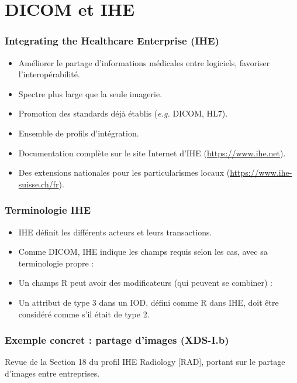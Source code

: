 \section{DICOM et IHE}

 \frame
 {
 	\frametitle{Integrating the Healthcare Enterprise (IHE)}
	
	\begin{itemize} 	 	
		\item Am\'eliorer le partage d'informations m\'edicales entre logiciels, favoriser l'interop\'erabilit\'e.
		\item<2-> Spectre plus large que la seule imagerie.
		\item<3-> Promotion des standards d\'ej\`a \'etablis (\emph{e.g.} DICOM, HL7).
		\item<4-> Ensemble de profils d'int\'egration.
		\item<5-> Documentation compl\`ete sur le site Internet d'IHE (\url{https://www.ihe.net}).
		\item<6-> Des extensions nationales pour les particularismes locaux (\url{https://www.ihe-suisse.ch/fr}).
	\end{itemize}

 }

\frame
 {
 	\frametitle{Terminologie IHE}
	
	\begin{itemize}
		\item<2-> IHE d\'efinit les diff\'erents acteurs et leurs transactions.
		\item<3-> Comme DICOM, IHE indique les champs requis selon les cas, avec sa terminologie propre :	
		\item<4-> Un champs R peut avoir des modificateurs (qui peuvent se combiner) :
		\item<7-> Un attribut de type 3 dans un IOD, d\'efini comme R dans IHE, doit \^etre consid\'er\'e comme s'il \'etait de type 2.
	\end{itemize}
	
 }

\frame
 {
 	\frametitle{Exemple concret : partage d'images (XDS-I.b)}
	Revue de la Section 18 du profil IHE Radiology [RAD], portant sur le partage d'images entre entreprises.
 }
